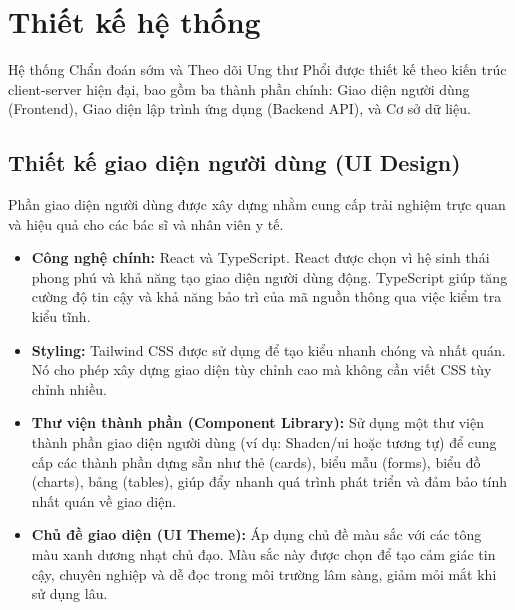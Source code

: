 \section{Thiết kế hệ thống}

Hệ thống Chẩn đoán sớm và Theo dõi Ung thư Phổi được thiết kế theo kiến trúc client-server hiện đại, bao gồm ba thành phần chính: Giao diện người dùng (Frontend), Giao diện lập trình ứng dụng (Backend API), và Cơ sở dữ liệu.

\subsection{Thiết kế giao diện người dùng (UI Design)}

Phần giao diện người dùng được xây dựng nhằm cung cấp trải nghiệm trực quan và hiệu quả cho các bác sĩ và nhân viên y tế.
\begin{itemize}
    \item \textbf{Công nghệ chính:} React và TypeScript. React được chọn vì hệ sinh thái phong phú và khả năng tạo giao diện người dùng động. TypeScript giúp tăng cường độ tin cậy và khả năng bảo trì của mã nguồn thông qua việc kiểm tra kiểu tĩnh.
    \item \textbf{Styling:} Tailwind CSS được sử dụng để tạo kiểu nhanh chóng và nhất quán. Nó cho phép xây dựng giao diện tùy chỉnh cao mà không cần viết CSS tùy chỉnh nhiều.
    \item \textbf{Thư viện thành phần (Component Library):} Sử dụng một thư viện thành phần giao diện người dùng (ví dụ: Shadcn/ui hoặc tương tự) để cung cấp các thành phần dựng sẵn như thẻ (cards), biểu mẫu (forms), biểu đồ (charts), bảng (tables), giúp đẩy nhanh quá trình phát triển và đảm bảo tính nhất quán về giao diện.
    \item \textbf{Chủ đề giao diện (UI Theme):} Áp dụng chủ đề màu sắc với các tông màu xanh dương nhạt chủ đạo. Màu sắc này được chọn để tạo cảm giác tin cậy, chuyên nghiệp và dễ đọc trong môi trường lâm sàng, giảm mỏi mắt khi sử dụng lâu.
\end{itemize}

